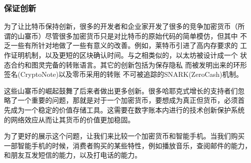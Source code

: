 \documentclass[letterpaper]{article}
\begin{document}
\subsubsection{保证创新}
为了让比特币保持创新，很多的开发者和企业家开发了很多的竞争加密货币（所
  谓的山寨币）尽管很多加密货币只是对比特币的原始代码的简单模仿，但其中
不乏一些有所针对地做了一些有意义的改善。例如，莱特币引进了高内存要求的
工作证明机制，以及更短的区块确认时间。与之相类似的，以太坊被设计成一个
状态合约和图灵完备的转账语言\cite{Ethereum}。其它的创新包括为保存隐私
而被发明出来的环形签名(CryptoNote)\cite{CryptoNote}以及零币采用的转账
不可被追踪的SNARK(ZeroCash)\cite{Zerocash}机制。

这些山寨币的崛起鼓舞了后来者做出更多创新。很多哈耶克式增长的支持者们忽
略了一个重要的问题，那就是对于一个加密货币，要想成为真正但货币，必须首
先成为一个稳定的价值存储工具。这需要在数字账本内进行的技术创新保护系统
的网络效应从而让其货币的价值更加稳固。


为了更好的展示这个问题，让我们来比较一个加密货币和智能手机。当我们购买
一部智能手机的时候，消费者购买的某些特性，例如播放音乐，查阅邮件的能力，
和朋友互发短信的能力，以及打电话的能力。
\end{document}
